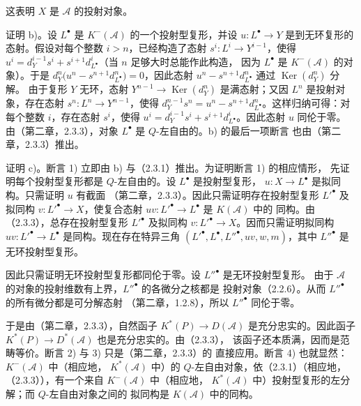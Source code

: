 \clearpage
{}%
\begingroup\small\setlength{\parskip}{0pt}\setlength{\emergencystretch}{1.5em}
\setlength{\abovedisplayskip}{4pt plus 2pt minus 2pt}%
\setlength{\belowdisplayskip}{4pt plus 2pt minus 2pt}%

这表明 $X$ 是 $\mathcal A$ 的投射对象。

证明 b)。设 $L^\bullet$ 是 $K^{-}(\mathcal A)$ 的一个投射型复形，并设
$u\colon L^\bullet\longrightarrow Y$ 是到无环复形的态射。假设对每个整数
$i>n$，已经构造了态射 $s^i\colon L^i\longrightarrow Y^{i-1}$，使得
$u^i=d_Y^{i-1}s^i+s^{i+1}d_{L^\bullet}^{i}$（当 $n$ 足够大时总能作此构造，
因为 $L^\bullet$ 是 $K^{-}(\mathcal A)$ 的对象）。于是
$d_Y^n\bigl(u^n-s^{n+1}d_{L^\bullet}^{n}\bigr)=0$，因此态射
$u^n-s^{n+1}d_{L^\bullet}^{n}$ 通过 $\operatorname{Ker}(d_Y^n)$ 分解。
由于复形 $Y$ 无环，态射
$Y^{n-1}\longrightarrow\operatorname{Ker}(d_Y^n)$ 是满态射；又因 $L^n$
是投射对象，存在态射 $s^n\colon L^n\longrightarrow Y^{n-1}$，使得
$d_Y^{n-1}s^n=u^n-s^{n+1}d_{L^\bullet}^{n}$。这样归纳可得：对每个整数
$i$，存在态射 $s^i$，使得
$u^i=d_Y^{i-1}s^i+s^{i+1}d_{L^\bullet}^{i}$。因此态射 $u$ 同伦于零。
由（第二章，2.3.3），对象 $L^\bullet$ 是 $Q$-左自由的。b) 的最后一项断言
也由（第二章，2.3.3）推出。

证明 c)。断言 1) 立即由 b) 与（2.3.1）推出。为证明断言 1) 的相应情形，
先证明每个投射型复形都是 $Q$-左自由的。设 $L^\bullet$ 是投射型复形，
$u\colon X\longrightarrow L^\bullet$ 是拟同构。只需证明 $u$ 有截面
（第二章，2.3.3）。因此只需证明存在投射型复形 ${L'}^\bullet$ 及拟同构
$v\colon {L'}^\bullet\longrightarrow X$，使复合态射
$uv\colon {L'}^\bullet\longrightarrow L^\bullet$ 是 $K(\mathcal A)$ 中的
同构。由（2.3.3），总存在投射型复形 ${L'}^\bullet$ 及拟同构
$v\colon {L'}^\bullet\longrightarrow X$。因而只需证明拟同构
$uv\colon {L'}^\bullet\longrightarrow L^\bullet$ 是同构。现在存在特异三角
$({L'}^\bullet,L^\bullet,{L''}^\bullet,uv,w,m)$，其中 ${L''}^\bullet$ 是
无环投射型复形。

因此只需证明无环投射型复形都同伦于零。设 ${L''}^\bullet$ 是无环投射型复形。
由于 $\mathcal A$ 的对象的投射维数有上界，${L''}^\bullet$ 的各微分之核都是
投射对象（2.2.6）。从而 ${L''}^\bullet$ 的所有微分都是可分解态射
（第二章，1.2.8），所以 ${L''}^\bullet$ 同伦于零。

于是由（第二章，2.3.3），自然函子
$K^{*}(P)\longrightarrow D(\mathcal A)$ 是充分忠实的。因此函子
$K^{*}(P)\longrightarrow D^{*}(\mathcal A)$ 也是充分忠实的。由（2.3.3），
该函子还本质满，因而是范畴等价。断言 2) 与 3) 只是（第二章，2.3.3）的
直接应用。断言 4) 也就显然：$K^{-}(\mathcal A)$ 中（相应地，
$K^{*}(\mathcal A)$ 中）的 $Q$-左自由对象，依（2.3.1）（相应地，
（2.3.3）），有一个来自 $K^{-}(\mathcal A)$ 中（相应地，
$K^{*}(\mathcal A)$ 中）投射型复形的左分解；而 $Q$-左自由对象之间的
拟同构是 $K(\mathcal A)$ 中的同构。
\endgroup

